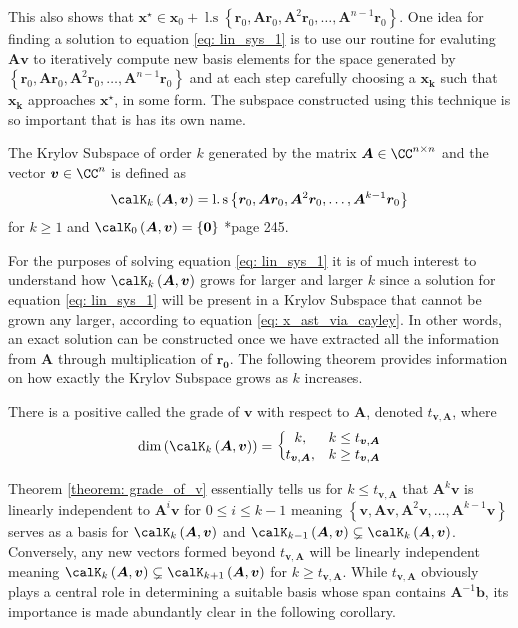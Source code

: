 This also shows that $\bm{x^{\star}} \in \bm{x}_0 + \operatorname{l.s} \left\{ \bm{r}_0, \bm{A} \bm{r}_0, \bm{A}^2 \bm{r}_0, \ldots , \bm{A}^{n-1} \bm{r}_0 \right\}$. One idea for finding a solution to equation \ref{eq: lin_sys_1} is to use our routine for evaluting $\bm{A} \bm{v}$ to iteratively compute new basis elements for the space generated by $\left\{ \bm{r}_0, \bm{A} \bm{r}_0, \bm{A}^2 \bm{r}_0, \ldots , \bm{A}^{n-1} \bm{r}_0 \right\}$ and at each step carefully choosing a $\bm{x_k}$ such that $\bm{x_k}$ approaches $\bm{x^{\star}}$, in some form. The subspace constructed using this technique is so important that is has its own name.
\begin{defe} \label{defe: krylov_subspace}
    The Krylov Subspace of order $k$ generated by the matrix $\bm{A} \in \CC^{n \times n}$ and the vector $\bm{v} \in \CC^{n}$ is defined as
    \[
        \calK_{k} \left( \bm{A},\bm{v} \right) = \operatorname{l.s} \left\{ \bm{r}_0, \bm{A} \bm{r}_0, \bm{A}^2 \bm{r}_0, \ldots , \bm{A}^{k-1} \bm{r}_0 \right\}
    \]
    for $k \geq 1$ and $\calK_{0} \left( \bm{A},\bm{v} \right) = \left\{ \bm{0} \right\}$ \cite{TrefethenLloydN.LloydNicholas1997Nla/}*{page 245}.
\end{defe}
For the purposes of solving equation \ref{eq: lin_sys_1} it is of much interest to understand how $\calK_{k} \left( \bm{A},\bm{v} \right)$ grows for larger and larger $k$ since a solution for equation \ref{eq: lin_sys_1} will be present in a Krylov Subspace that cannot be grown any larger, according to equation \ref{eq: x_ast_via_cayley}. In other words, an exact solution can be constructed once we have extracted all the information from $\bm{A}$ through multiplication of $\bm{r_0}$. The following theorem provides information on how exactly the Krylov Subspace grows as $k$ increases.
\begin{thm} \label{theorem: grade_of_v}
    There is a positive called the grade of $\bm{v}$ with respect to $\bm{A}$, denoted $t_{\bm{v}, \bm{A}}$, where
    \[
        \operatorname{dim} \left( \calK_{k} \left( \bm{A} , \bm{v} \right) \right) = \left\{
        \begin{matrix}
            k,                  & k \leq t_{\bm{v}, \bm{A}} \\
            t_{\bm{v}, \bm{A}}, & k \geq t_{\bm{v}, \bm{A}}
        \end{matrix}
        \right.
    \]
\end{thm}
Theorem \ref{theorem: grade_of_v} essentially tells us for $k \leq t_{\bm{v}, \bm{A}}$ that $\bm{A}^k \bm{v}$ is linearly independent to $\bm{A}^i \bm{v}$ for $0 \leq i \leq k-1$ meaning $\left\{ \bm{v}, \bm{A} \bm{v}, \bm{A}^2 \bm{v}, \ldots , \bm{A}^{k-1} \bm{v} \right\}$ serves as a basis for $\calK_{k} \left( \bm{A},\bm{v} \right)$ and $\calK_{k-1} \left( \bm{A},\bm{v} \right) \subsetneq \calK_{k} \left( \bm{A},\bm{v} \right)$. Conversely, any new vectors formed beyond $t_{\bm{v}, \bm{A}}$ will be linearly independent meaning $\calK_{k} \left( \bm{A},\bm{v} \right) \subsetneq \calK_{k+1} \left( \bm{A},\bm{v} \right)$ for $k \geq t_{\bm{v}, \bm{A}}$. While $t_{\bm{v}, \bm{A}}$ obviously plays a central role in determining a suitable basis whose span contains $\bm{A}^{-1} \bm{b}$, its importance is made abundantly clear in the following corollary.

